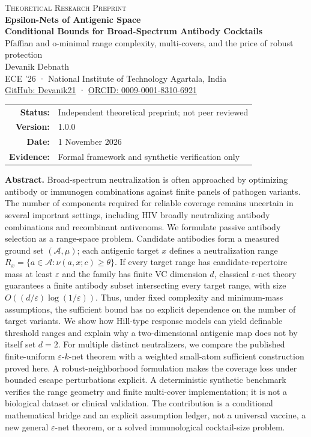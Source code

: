 \documentclass[11pt,a4paper]{article}
\newcommand{\Acal}{\mathcal A}
\newcommand{\eps}{\varepsilon}
\begin{document}
\hypersetup{pageanchor=false}
\begin{titlepage}\centering\vspace*{.45in}
{\large\color{teal}\textsc{Theoretical Research Preprint}}\\[1em]
{\huge\bfseries\color{ink}Epsilon-Nets of Antigenic Space}\\[.45em]
{\LARGE\bfseries Conditional Bounds for Broad-Spectrum Antibody Cocktails}\\[1em]
{\large Pfaffian and o-minimal range complexity, multi-covers, and the price of robust protection}\\[1.8em]
{\Large Devanik Debnath}\\[.3em]
{
\normalsize ECE '26 · National Institute of Technology Agartala, India}\\
{
\normalsize \href{https://github.com/Devanik21}{GitHub: Devanik21} · \href{https://orcid.org/0009-0001-8310-6921}{ORCID: 0009-0001-8310-6921}}\\[1.25em]
\begin{tabular}{rl}\textbf{Status:}& Independent theoretical preprint; not peer reviewed\\\textbf{Version:}&1.0.0\\\textbf{Date:}&1 November 2026\\\textbf{Evidence:}& Formal framework and synthetic verification only\end{tabular}
\vfill
\begin{minipage}{.93\textwidth}\small
\textbf{Abstract.} Broad-spectrum neutralization is often approached by optimizing antibody or immunogen combinations against finite panels of pathogen variants. The number of components required for reliable coverage remains uncertain in several important settings, including HIV broadly neutralizing antibody combinations and recombinant antivenoms. We formulate passive antibody selection as a range-space problem. Candidate antibodies form a measured ground set $(\Acal,\mu)$; each antigenic target $x$ defines a neutralization range $R_x=\{a\in\Acal:\nu(a,x;c)\geq\theta\}$. If every target range has candidate-repertoire mass at least $\eps$ and the family has finite VC dimension $d$, classical $\eps$-net theory guarantees a finite antibody subset intersecting every target range, with size $O((d/\eps)\log(1/\eps))$. Thus, under fixed complexity and minimum-mass assumptions, the sufficient bound has no explicit dependence on the number of target variants. We show how Hill-type response models can yield definable threshold ranges and explain why a two-dimensional antigenic map does not by itself set $d=2$. For multiple distinct neutralizers, we compare the published finite-uniform $\eps$-$k$-net theorem with a weighted small-atom sufficient construction proved here. A robust-neighborhood formulation makes the coverage loss under bounded escape perturbations explicit. A deterministic synthetic benchmark verifies the range geometry and finite multi-cover implementation; it is not a biological dataset or clinical validation. The contribution is a conditional mathematical bridge and an explicit assumption ledger, not a universal vaccine, a new general $\eps$-net theorem, or a solved immunological cocktail-size problem.

\end{minipage}
\end{titlepage}
\end{document}
